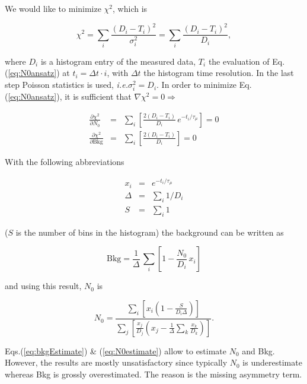 \documentclass[twoside]{article}
\newcommand{\ie}{\emph{i.e.\xspace}}
\begin{document}
We would like to minimize $\chi^2$, which is

\begin{equation}\label{eq:chisq}
 \chi^2 = \sum_i \frac{(D_i - T_i)^2}{\sigma_i^2} = \sum_i \frac{(D_i -
T_i)^2}{D_i},
\end{equation}

\noindent where $D_i$ is a histogram entry of the measured data, $T_i$ the
evaluation of Eq.(\ref{eq:N0ansatz}) at $t_i = \Delta t \cdot i$, with $\Delta
t$ the histogram time resolution. In the last step Poisson statistics is used,
\ie $\sigma_i^2 = D_i$.
In order to minimize Eq.(\ref{eq:N0ansatz}), it is sufficient that $\nabla
\chi^2 = 0 \Longrightarrow$

\begin{eqnarray*}
 \frac{\partial \chi^2}{\partial N_0} &=& \sum_i \left[ \frac{2 (D_i -
T_i)}{D_i}\, e^{-t_i/\tau_\mu} \right] = 0 \\
 \frac{\partial \chi^2}{\partial \mathrm{Bkg}} &=& \sum_i \left[ \frac{2 (D_i -
T_i)}{D_i} \right] = 0 
\end{eqnarray*}

\noindent With the following abbreviations

\begin{eqnarray}\label{eq:abbrv}
  x_i &=& e^{-t_i/\tau_\mu} \\
  \Delta &=& \sum_i 1/D_i \nonumber \\
  S &=& \sum_i 1 \nonumber
\end{eqnarray}

\noindent ($S$ is the number of bins in the histogram) the background can be
written as

\begin{equation}\label{eq:bkgEstimate}
 \mathrm{Bkg} = \frac{1}{\Delta}\, \sum_i \left[ 1 - \frac{N_0}{D_i}\, x_i
\right]
\end{equation}
 
\noindent and using this result, $N_0$ is

\begin{equation}\label{eq:N0estimate}
 N_0 = \frac{\displaystyle\sum_i \left[x_i \left(1-\frac{S}{D_i
\Delta}\right)\right]}{\displaystyle\sum_j \left[\frac{x_j}{D_j}\left(x_j -
\frac{1}{\Delta} \sum_k \frac{x_k}{D_k}\right)\right]}.
\end{equation}

\noindent Eqs.(\ref{eq:bkgEstimate}) \& (\ref{eq:N0estimate}) allow to estimate
$N_0$ and Bkg. However, the results are mostly unsatisfactory since typically
$N_0$ is underestimate whereas Bkg is grossly overestimated. The reason is the
missing asymmetry term.
\end{document}
